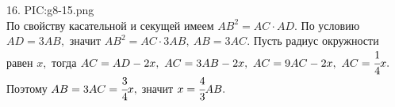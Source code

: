 16. {{PIC:g8-15.png}}\\
По свойству касательной и секущей имеем $AB^2=AC\cdot AD.$ По условию $AD=3AB,$ значит $AB^2=AC\cdot3AB,\ AB=3AC.$ Пусть радиус окружности равен $x,$ тогда $AC=AD-2x,\ AC=3AB-2x,\ AC=9AC-2x,\ AC=\cfrac{1}{4}x.$ Поэтому $AB=3AC=\cfrac{3}{4}x,$ значит $x=\cfrac{4}{3}AB.$\newpage\noindent
